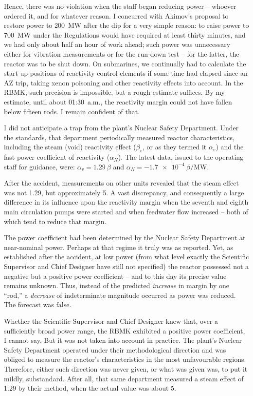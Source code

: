 \documentclass[openright]{bookest}
\begin{document}
Hence, there was no violation when the staff began reducing power -- whoever ordered it, and for whatever reason. I concurred with Akimov's proposal to restore power to \qty{200}{\mega\watt} after the dip for a very simple reason: to raise power to \qty{700}{\mega\watt} under the Regulations would have required at least thirty minutes, and we had only about half an hour of work ahead; such power was unnecessary either for vibration measurements or for the run-down test -- for the latter, the reactor was to be shut down. On submarines, we continually had to calculate the start-up positions of reactivity-control elements if some time had elapsed since an AZ trip, taking xenon poisoning and other reactivity effects into account. In the RBMK, such precision is impossible, but a rough estimate suffices. By my estimate, until about 01:30~a.m., the reactivity margin could not have fallen below fifteen rods. I remain confident of that.

I did not anticipate a trap from the plant's Nuclear Safety Department. Under the standards, that department periodically measured reactor characteristics, including the steam (void) reactivity effect ($\beta_v$, or as they termed it $\alpha_v$) and the fast power coefficient of reactivity ($\alpha_N$). The latest data, issued to the operating staff for guidance, were: $\alpha_v = \qty{+1.29}{\beta}$ and $\alpha_N = \qty{-1.7e-4}{\beta\per\mega\watt}$.

After the accident, measurements on other units revealed that the steam effect was not \qty{+1.29}{\beta}, but approximately \qty{+5}{\beta}. A vast discrepancy, and consequently a large difference in its influence upon the reactivity margin when the seventh and eighth main circulation pumps were started and when feedwater flow increased -- both of which tend to reduce that margin.

The power coefficient had been determined by the Nuclear Safety Department at near-nominal power. Perhaps at that regime it truly was as reported. Yet, as established after the accident, at low power (from what level exactly the Scientific Supervisor and Chief Designer have still not specified) the reactor possessed not a negative but a positive power coefficient -- and to this day its precise value remains unknown. Thus, instead of the predicted \textit{increase} in margin by one ``rod,'' a \textit{decrease} of indeterminate magnitude occurred as power was reduced. The forecast was false.

Whether the Scientific Supervisor and Chief Designer knew that, over a sufficiently broad power range, the RBMK exhibited a positive power coefficient, I cannot say. But it was not taken into account in practice. The plant's Nuclear Safety Department operated under their methodological direction and was obliged to measure the reactor's characteristics in the most unfavourable regions. Therefore, either such direction was never given, or what was given was, to put it mildly, substandard. After all, that same department measured a steam effect of \qty{+1.29}{\beta} by their method, when the actual value was about \qty{+5}{\beta}.
\end{document}
